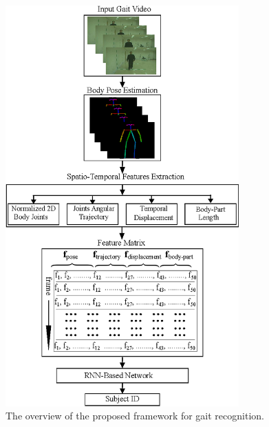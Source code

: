 \begin{figure}
	\centering
	\includegraphics[width=0.8\textwidth]{figures/proposed_method.eps}
	\caption [The overview of the proposed framework for gait recognition] 
	{The overview of the proposed framework for gait recognition.  \label{fig:overview_proposed_method}
	}	
\end{figure}

